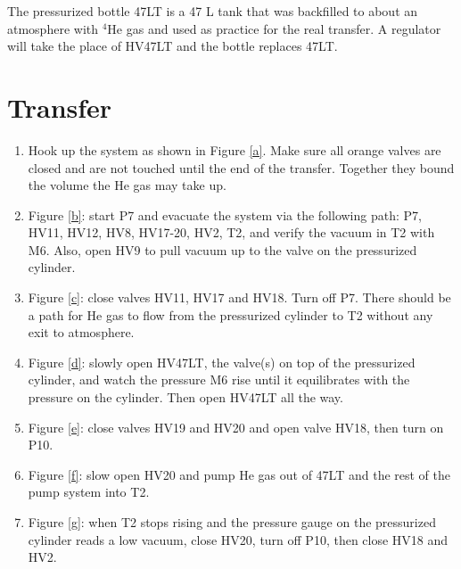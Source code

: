 \documentclass[a4paper,10pt]{article}
\begin{document}
The pressurized bottle 47LT is a 47 L tank that was backfilled to about an atmosphere with $^4$He gas and used as practice for the real transfer.  A regulator will take the place of HV47LT and the bottle replaces 47LT.

\section{Transfer}
\begin{enumerate}
 \item Hook up the system as shown in Figure \ref{a}.  Make sure all orange valves are closed and are not touched until the end of the transfer.  Together they bound the volume the He gas may take up.
 \item Figure \ref{b}: start P7 and evacuate the system via the following path: P7, HV11, HV12, HV8, HV17-20, HV2, T2, and verify the vacuum in T2 with M6.  Also, open HV9 to pull vacuum up to the valve on the pressurized cylinder.
 \item Figure \ref{c}: close valves HV11, HV17 and HV18.  Turn off P7.  There should be a path for He gas to flow from the pressurized cylinder to T2 without any exit to atmosphere.
 \item Figure \ref{d}: slowly open HV47LT, the valve(s) on top of the pressurized cylinder, and watch the pressure M6 rise until it equilibrates with the pressure on the cylinder.  Then open HV47LT all the way.
 \item Figure \ref{e}: close valves HV19 and HV20 and open valve HV18, then turn on P10.
 \item Figure \ref{f}: slow open HV20 and pump He gas out of 47LT and the rest of the pump system into T2.
 \item Figure \ref{g}: when T2 stops rising and the pressure gauge on the pressurized cylinder reads a low vacuum, close HV20, turn off P10, then close HV18 and HV2.
\end{enumerate}
\end{document}
